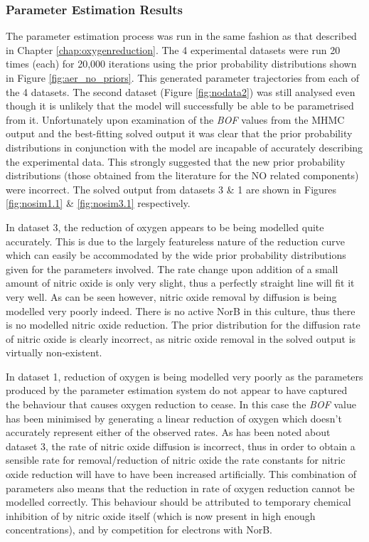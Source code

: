 \subsubsection{Parameter Estimation Results}
The parameter estimation process was run in the same fashion as that described in Chapter \ref{chap:oxygenreduction}. The 4 experimental datasets were run 20 times (each) for 20,000 iterations using the prior probability distributions shown in Figure \ref{fig:aer_no_priors}. This generated parameter trajectories from each of the 4 datasets. The second dataset (Figure \ref{fig:nodata2}) was still analysed even though it is unlikely that the model will successfully be able to be parametrised from it. Unfortunately upon examination of the \textit{BOF} values from the MHMC output and the best-fitting solved output it was clear that the prior probability distributions in conjunction with the model are incapable of accurately describing the experimental data. This strongly suggested that the new prior probability distributions (those obtained from the literature for the NO related components) were incorrect. The solved output from datasets 3 \& 1 are shown in Figures \ref{fig:nosim1.1} \& \ref{fig:nosim3.1} respectively.

In dataset 3, the reduction of oxygen appears to be being modelled quite accurately. This is due to the largely featureless nature of the reduction curve which can easily be accommodated by the wide prior probability distributions given for the parameters involved. The rate change upon addition of a small amount of nitric oxide is only very slight, thus a perfectly straight line will fit it very well. As can be seen however, nitric oxide removal by diffusion is being modelled very poorly indeed. There is no active NorB in this culture, thus there is no modelled nitric oxide reduction. The prior distribution for the diffusion rate of nitric oxide is clearly incorrect, as nitric oxide removal in the solved output is virtually non-existent.

In dataset 1, reduction of oxygen is being modelled very poorly as the parameters produced by the parameter estimation system do not appear to have captured the behaviour that causes oxygen reduction to cease. In this case the \textit{BOF} value has been minimised by generating a linear reduction of oxygen which doesn't accurately represent either of the observed rates. As has been noted about dataset 3, the rate of nitric oxide diffusion is incorrect, thus in order to obtain a sensible rate for removal/reduction of nitric oxide the rate constants for nitric oxide reduction will have to have been increased artificially. This combination of parameters also means that the reduction in rate of oxygen reduction cannot be modelled correctly. This behaviour should be attributed to temporary chemical inhibition of \cbbthree{} by nitric oxide itself (which is now present in high enough concentrations), and by competition for electrons with NorB.

